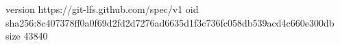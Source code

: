 version https://git-lfs.github.com/spec/v1
oid sha256:8c407378ff0a0f69d2fd2d7276ad6635d1f3c736fc058db539acd4c660e300db
size 43840
